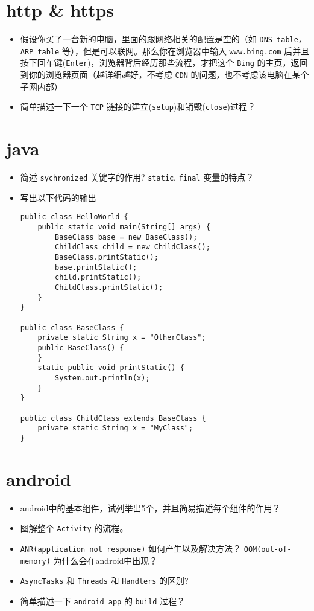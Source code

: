 \documentclass[11pt]{article}
\author{Zongxiong Chen}
\date{\today}
\title{}
\begin{document}
\section{http \& https}
\label{sec:org8c55c21}
\begin{itemize}
\item 假设你买了一台新的电脑，里面的跟网络相关的配置是空的（如 \texttt{DNS table，ARP table} 等），但是可以联网。那么你在浏览器中输入 \texttt{www.bing.com} 后并且按下回车键(\texttt{Enter})，浏览器背后经历那些流程，才把这个 \texttt{Bing} 的主页，返回到你的浏览器页面（越详细越好，不考虑 \texttt{CDN} 的问题，也不考虑该电脑在某个子网内部）
\item 简单描述一下一个 \texttt{TCP} 链接的建立(\texttt{setup})和销毁(\texttt{close})过程？
\end{itemize}

\section{java}
\label{sec:orgce2e565}
\begin{itemize}
\item 简述 \texttt{sychronized} 关键字的作用? \texttt{static}, \texttt{final} 变量的特点？
\item 写出以下代码的输出
\begin{verbatim}
public class HelloWorld {
    public static void main(String[] args) {
        BaseClass base = new BaseClass();
        ChildClass child = new ChildClass();
        BaseClass.printStatic();
        base.printStatic();
        child.printStatic();
        ChildClass.printStatic();
    }
}

public class BaseClass {
    private static String x = "OtherClass";
    public BaseClass() {
    }
    static public void printStatic() {
        System.out.println(x);
    }
}

public class ChildClass extends BaseClass {
    private static String x = "MyClass";
}
\end{verbatim}
\end{itemize}

\section{android}
\label{sec:orgcb46dc3}
\begin{itemize}
\item android中的基本组件，试列举出5个，并且简易描述每个组件的作用？
\item 图解整个 \texttt{Activity} 的流程。
\item \texttt{ANR(application not response)} 如何产生以及解决方法？ \texttt{OOM(out-of-memory)} 为什么会在android中出现？
\item \texttt{AsyncTasks} 和 \texttt{Threads} 和 \texttt{Handlers} 的区别?
\item 简单描述一下 \texttt{android app} 的 \texttt{build} 过程？
\end{itemize}
\end{document}
